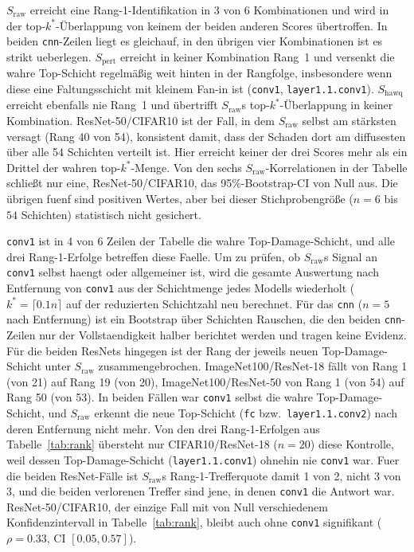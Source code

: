 $S_{\mathrm{raw}}$ erreicht eine Rang-1-Identifikation in 3 von 6 Kombinationen und wird in der top-$k^*$-Überlappung von keinem der beiden anderen Scores übertroffen. In beiden \texttt{cnn}-Zeilen liegt es gleichauf, in den übrigen vier Kombinationen ist es strikt ueberlegen. $S_{\mathrm{pert}}$ erreicht in keiner Kombination Rang~1 und versenkt die wahre Top-Schicht regelmäßig weit hinten in der Rangfolge, insbesondere wenn diese eine Faltungsschicht mit kleinem Fan-in ist (\texttt{conv1}, \texttt{layer1.1.conv1}). $S_{\mathrm{hawq}}$ erreicht ebenfalls nie Rang~1 und übertrifft $S_{\mathrm{raw}}$s top-$k^*$-Überlappung in keiner Kombination. ResNet-50/CIFAR10 ist der Fall, in dem $S_{\mathrm{raw}}$ selbst am stärksten versagt (Rang 40 von 54), konsistent damit, dass der Schaden dort am diffusesten über alle 54 Schichten verteilt ist. Hier erreicht keiner der drei Scores mehr als ein Drittel der wahren top-$k^*$-Menge. Von den sechs $S_{\mathrm{raw}}$-Korrelationen in der Tabelle schließt nur eine, ResNet-50/CIFAR10, das 95\%-Bootstrap-CI von Null aus. Die übrigen fuenf sind positiven Wertes, aber bei dieser Stichprobengröße ($n=6$ bis $54$ Schichten) statistisch nicht gesichert.
\par\medskip

\texttt{conv1} ist in 4 von 6 Zeilen der Tabelle die wahre Top-Damage-Schicht, und alle drei Rang-1-Erfolge betreffen diese Faelle. Um zu prüfen, ob $S_{\mathrm{raw}}$s Signal an \texttt{conv1} selbst haengt oder allgemeiner ist, wird die gesamte Auswertung nach Entfernung von \texttt{conv1} aus der Schichtmenge jedes Modells wiederholt ($k^*=\lceil 0.1n\rceil$ auf der reduzierten Schichtzahl neu berechnet. Für das \texttt{cnn} ($n=5$ nach Entfernung) ist ein Bootstrap über Schichten Rauschen, die den beiden \texttt{cnn}-Zeilen nur der Vollstaendigkeit halber berichtet werden und tragen keine Evidenz. Für die beiden ResNets hingegen ist der Rang der jeweils neuen Top-Damage-Schicht unter $S_{\mathrm{raw}}$ zusammengebrochen. ImageNet100/ResNet-18 fällt von Rang 1 (von 21) auf Rang 19 (von 20), ImageNet100/ResNet-50 von Rang 1 (von 54) auf Rang 50 (von 53). In beiden Fällen war \texttt{conv1} selbst die wahre Top-Damage-Schicht, und $S_{\mathrm{raw}}$ erkennt die neue Top-Schicht (\texttt{fc} bzw.\ \texttt{layer1.1.conv2}) nach deren Entfernung nicht mehr. Von den drei Rang-1-Erfolgen aus Tabelle~\ref{tab:rank} übersteht nur CIFAR10/ResNet-18 ($n=20$) diese Kontrolle, weil dessen Top-Damage-Schicht (\texttt{layer1.1.conv1}) ohnehin nie \texttt{conv1} war. Fuer die beiden ResNet-Fälle ist $S_{\mathrm{raw}}$s Rang-1-Trefferquote damit 1 von 2, nicht 3 von 3, und die beiden verlorenen Treffer sind jene, in denen \texttt{conv1} die Antwort war. ResNet-50/CIFAR10, der einzige Fall mit von Null verschiedenem Konfidenzintervall in Tabelle~\ref{tab:rank}, bleibt auch ohne \texttt{conv1} signifikant ($\rho=0.33$, CI $[0.05,0.57]$).

